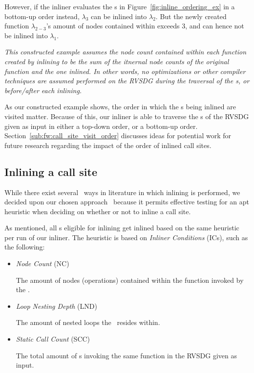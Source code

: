 However, if the inliner evaluates the \applyNode s in
Figure~\ref{fig:inline_ordering_ex} in a bottom-up order instead, $\lambda_3$
can be inlined into $\lambda_2$. But the newly created function
$\lambda_{2-3}$'s amount of nodes contained within exceeds 3, and can hence not
be inlined into $\lambda_1$.

\textit{This constructed example assumes the node count contained within each
function created by inlining to be the sum of the itnernal node counts of the
original function and the one inlined. In other words, no optimizations or other
compiler techniques are assumed performed on the RVSDG during the traversal of
the \applyNode s, or before/after each inlining.}

As our constructed example shows, the order in which the \applyNode s being
inlined are visited matter. Because of this, our inliner is able to traverse the
\applyNode s of the RVSDG given as input in either a top-down order, or a
bottom-up order. Section~\ref{sub:fw:call_site_visit_order} discusses
ideas for potential work for future research regarding the impact of the order
of inlined call sites.

\subsection{Inlining a call site}
\label{sub:scheme:inlining_apply_nodes}

While there exist several~\cite{GHCPaper,AdaptvStratInlSubst} ways in
literature in which inlining is performed, we decided upon our chosen
approach~\cite{AdaptvCompilAndInlingWaterman} because it permits effective
testing for an apt heuristic when deciding on whether or not to inline a call
site.

As mentioned, all \applyNode s eligible for inlining get inlined based on the
same heuristic per run of our inliner. The heuristic is based on \textit{Inliner
Conditions} (ICs), such as the following:

\begin{itemize}
	\item \textit{Node Count} (NC)

The amount of nodes (operations) contained within the function invoked by the
\applyNode .

	\item \textit{Loop Nesting Depth} (LND)

The amount of nested loops the \applyNode~resides within.

	\item \textit{Static Call Count} (SCC)

The total amount of \applyNode s invoking the same function in the RVSDG given
as input.
\end{itemize}

